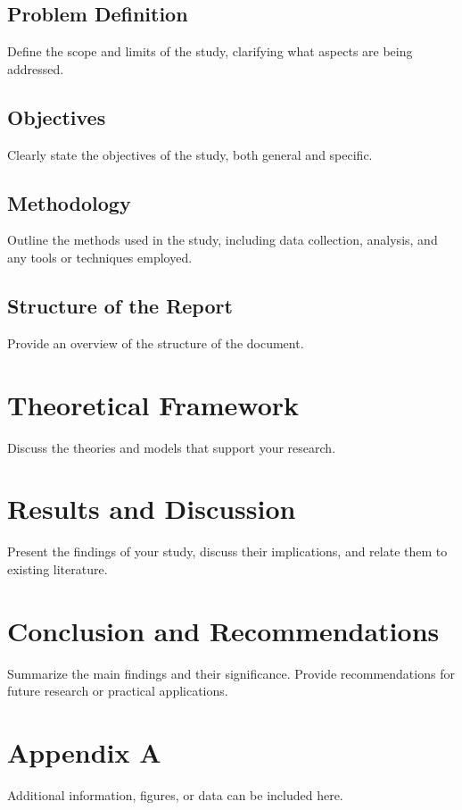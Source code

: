 \documentclass[a4paper,12pt]{article}
\begin{document}
\subsection{Problem Definition}
\noindent
Define the scope and limits of the study, clarifying what aspects are being addressed.

\subsection{Objectives}
\noindent
Clearly state the objectives of the study, both general and specific.

\subsection{Methodology}
\noindent
Outline the methods used in the study, including data collection, analysis, and any tools or techniques employed.

\subsection{Structure of the Report}
\noindent
Provide an overview of the structure of the document.

\section{Theoretical Framework}
\noindent
Discuss the theories and models that support your research.

\section{Results and Discussion}
\noindent
Present the findings of your study, discuss their implications, and relate them to existing literature.

\section{Conclusion and Recommendations}
\noindent
Summarize the main findings and their significance. Provide recommendations for future research or practical applications.

\newpage



\appendix
\section{Appendix A}
\noindent
Additional information, figures, or data can be included here.
\end{document}
